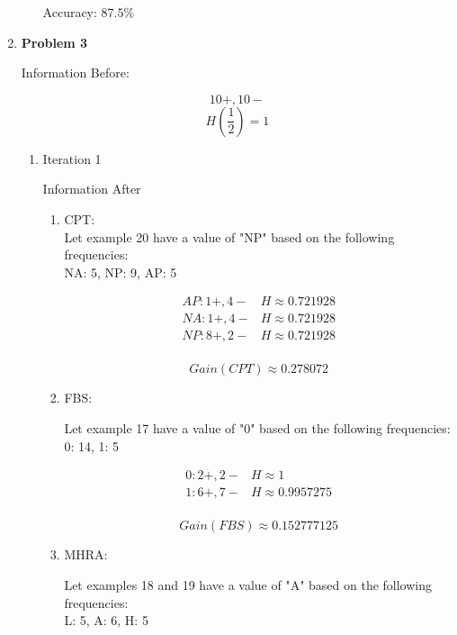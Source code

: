 \begin{enumerate}
\begin{enumerate}
				Accuracy: \( 87.5\% \)

		\end{enumerate}

	\item{\bf{Problem 3}}
	
		Information Before:
		
		\[
			10+, 10- 
		\]
		\[
			H(\frac{1}{2}) = 1
		\]
		
		\begin{enumerate}
		
			\item{Iteration 1}
			
				Information After
		
				\begin{enumerate}
				
					\item{CPT:} \\
						
						Let example 20 have a value of "NP" based on the following frequencies: \\
						NA: 5, NP: 9, AP: 5
						
						\[
							\begin{array}{l|l}
								AP: 1+, 4- & H \approx 0.721928 \\
								NA: 1+, 4- & H \approx 0.721928 \\
								NP: 8+, 2- & H \approx 0.721928 \\
							\end{array}
						\] 
						
						\[
							Gain(CPT) \approx 0.278072
						\]
					
					\item{FBS:}
					
						Let example 17 have a value of "0" based on the following frequencies: \\
						0: 14, 1: 5

						\[
							\begin{array}{l|l}
								0: 2+, 2- & H \approx 1 \\
								1: 6+, 7- & H \approx 0.9957275 \\
							\end{array}
						\] 
						
						\[
							Gain(FBS) \approx 0.152777125
						\]

					\item{MHRA:}
					
						Let examples 18 and 19 have a value of "A" based on the following frequencies: \\
						L: 5, A: 6, H: 5


\end{enumerate}
\end{enumerate}
\end{enumerate}
